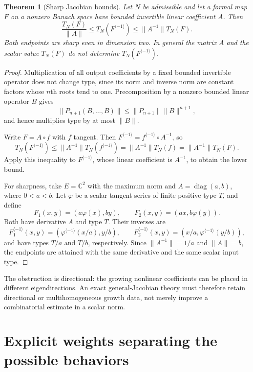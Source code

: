 \documentclass[11pt,a4paper]{article}
\numberwithin{equation}{section}
\newtheorem{theorem}{Theorem}[section]
\theoremstyle{definition}
\theoremstyle{remark}
\newcommand{\C}{\mathbb C}
\newcommand{\Type}{T_N}
\newcommand{\inv}[1]{#1^{\langle-1\rangle}}
\begin{document}
\begin{theorem}[Sharp Jacobian bounds]
\label{thm:jacobian}
Let $N$ be admissible and let a formal map $F$ on a nonzero Banach space
have bounded invertible linear coefficient $A$. Then
\begin{equation}
 \boxed{\displaystyle
 \frac{\Type(F)}{\|A\|}\le\Type(\inv F)
                         \le\|A^{-1}\|\Type(F).}
 \label{eq:jacobianbounds}
\end{equation}
Both endpoints are sharp even in dimension two. In general the matrix
$A$ and the scalar value $\Type(F)$ do not determine
$\Type(\inv F)$.
\end{theorem}
\begin{proof}
Multiplication of all output coefficients by a fixed bounded invertible
operator does not change type, since its norm and inverse norm are
constant factors whose $n$th roots tend to one. Precomposition by a
nonzero bounded linear operator $B$ gives
\[
 \|P_{n+1}(B,\ldots,B)\|\le\|P_{n+1}\|\|B\|^{n+1},
\]
and hence multiplies type by at most $\|B\|$.

Write $F=A\circ f$ with $f$ tangent. Then
$\inv F=\inv f\circ A^{-1}$, so
\[
 \Type(\inv F)\le\|A^{-1}\|\Type(\inv f)
                   =\|A^{-1}\|\Type(f)
                   =\|A^{-1}\|\Type(F).
\]
Apply this inequality to $\inv F$, whose linear coefficient is
$A^{-1}$, to obtain the lower bound.

For sharpness, take $E=\C^2$ with the maximum norm and
$A=\operatorname{diag}(a,b)$, where $0<a<b$. Let $\varphi$ be a
scalar tangent series of finite positive type $T$, and define
\[
 F_1(x,y)=(a\varphi(x),by),\qquad
 F_2(x,y)=(ax,b\varphi(y)).
\]
Both have derivative $A$ and type $T$. Their inverses are
\[
 \inv F_1(x,y)=(\inv\varphi(x/a),y/b),\qquad
 \inv F_2(x,y)=(x/a,\inv\varphi(y/b)),
\]
and have types $T/a$ and $T/b$, respectively. Since
$\|A^{-1}\|=1/a$ and $\|A\|=b$, the endpoints are attained with the
same derivative and the same scalar input type.
\end{proof}

The obstruction is directional: the growing nonlinear coefficients can
be placed in different eigendirections. An exact general-Jacobian theory
must therefore retain directional or multihomogeneous growth data, not
merely improve a combinatorial estimate in a scalar norm.

\section{Explicit weights separating the possible behaviors}
\label{sec:examples}
\end{document}
